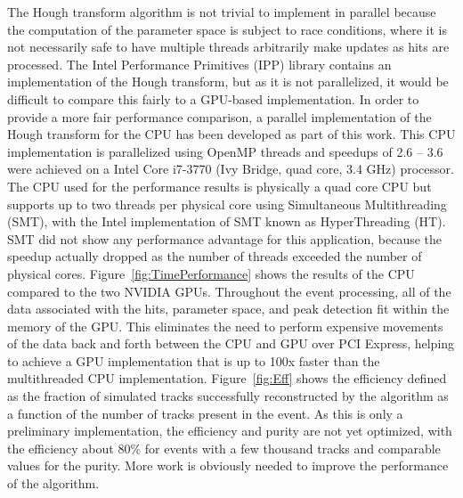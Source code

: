 \documentclass{JINST}
\begin{document}
The Hough transform algorithm is not trivial to implement in parallel because the computation of the parameter space is
subject to race conditions, where it is not necessarily safe to have multiple threads arbitrarily make updates as hits
are processed.  The Intel Performance Primitives (IPP) library contains an implementation of the Hough transform, but as
it is not parallelized, it would be difficult to compare this fairly to a GPU-based implementation. In order to provide
a more fair performance comparison, a parallel implementation of the Hough transform for the CPU has been developed as
part of this work.  This CPU implementation is parallelized using OpenMP threads and speedups of 2.6 -- 3.6 were
achieved on a Intel Core i7-3770 (Ivy Bridge, quad core, 3.4 GHz) processor.  The CPU used for the performance results
is physically a quad core CPU but supports up to two threads per physical core using Simultaneous Multithreading (SMT),
with the Intel implementation of SMT known as HyperThreading (HT).  SMT did not show any performance advantage for this
application, because the speedup actually dropped as the number of threads exceeded the number of physical
cores. Figure~\ref{fig:TimePerformance} shows the results of the CPU compared to the two NVIDIA GPUs. Throughout the
event processing, all of the data associated with the hits, parameter space, and peak detection fit within the memory of
the GPU.  This eliminates the need to perform expensive movements of the data back and forth between the CPU and GPU
over PCI Express, helping to achieve a GPU implementation that is up to 100x faster than the multithreaded CPU
implementation. Figure~\ref{fig:Eff} shows the efficiency defined as the fraction of simulated tracks successfully
reconstructed by the algorithm as a function of the number of tracks present in the event. As this is only a preliminary 
implementation, the efficiency and purity are not yet optimized, with the efficiency about 80\% for events with a few 
thousand tracks and comparable values for the purity. More work is obviously needed to improve the performance of the 
algorithm.
\end{document}
